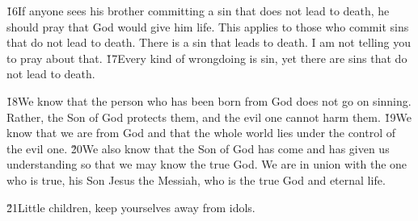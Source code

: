 \v{16}If anyone sees his brother committing a sin that does not lead to death, he should pray that God would give him life. This applies to those who commit sins that do not lead to death. There is a sin that leads to death. I am not telling you to pray about that. \v{17}Every kind of wrongdoing is sin, yet there are sins that do not lead to death.

\v{18}We know that the person who has been born from God does not go on sinning. Rather, the Son of God protects them, and the evil one cannot harm them. \v{19}We know that we are from God and that the whole world lies under the control of the evil one. \v{20}We also know that the Son of God has come and has given us understanding so that we may know the true God. We are in union with the one who is true, his Son Jesus the Messiah, who is the true God and eternal life.

\v{21}Little children, keep yourselves away from idols.
